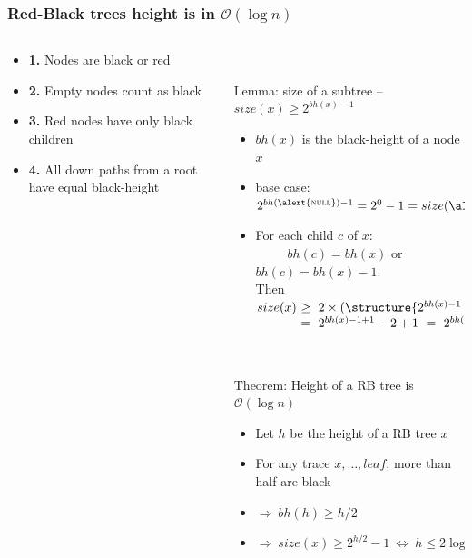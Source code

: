 \documentclass[aspectratio=169]{beamer}
\begin{document}
\begin{frame}\frametitle{Red-Black trees height is in $\mathcal{O}(\log n)$}
  
  \begin{columns}
  \begin{column}{.24\textwidth}
  \begin{itemize}
  \item \alert{\textbf{1.}} Nodes are black or red
  \item \alert{\textbf{2.}} Empty nodes count as black
  \item \alert{\textbf{3.}} Red nodes have only black children
  \item \alert{\textbf{4.}} All down paths from a root have equal black-height
\end{itemize}%
\end{column}
\begin{column}{.65\textwidth}
  ~\\[-3mm]
  \begin{exampleblock}{Lemma: size of a subtree -- $size(x) \geq 2^{bh(x)-1}$}
  \begin{itemize}
    \item $bh(x)$ is the black-height of a node $x$
    \item \alert{base case:} $2^{bh(\alert{\textsc{null}})-1} = 2^0-1 = size(\alert{\textsc{null}}) $
    \item {} For each child $c$ of $x$:
    \\~~~~~$bh(c)=bh(x)$ or $bh(c)=bh(x)-1$.
    \\
    Then  $\begin{array}[t]{@{}l@{~}l@{}}
    size(x) &\geq~ 2\times(\structure{2^{bh(x)-1}-1}) + 1
          \\&=~ 2^{bh(x)-1+1}-2+1 ~=~ 2^{bh(x)-1}
      \end{array}$
  \end{itemize}
  \end{exampleblock}
  ~\\[-9mm]
  \begin{exampleblock}{Theorem: Height of a RB tree is $\mathcal{O}(\log n)$}
    \begin{itemize}
      \item Let $h$ be the height of a RB tree $x$
      \item For any trace $x,\ldots,leaf$, more than half are black%
      \item $\Rightarrow ~ bh(h)\geq h/2$
      \item $\Rightarrow ~ size(x) \geq 2^{h/2} -1
            ~\Leftrightarrow ~ h \leq 2\log n + 1 \in \mathcal{O}(\log n)$
    \end{itemize}
  \end{exampleblock}
\end{column}

\end{columns}


\end{frame}
\end{document}
